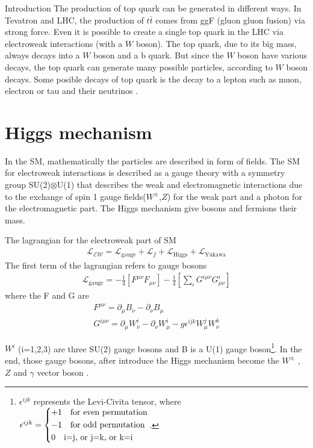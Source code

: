 \begin{chapter}{Introduction}
The production of top quark can be generated in different ways. In Tevatron and LHC, the production of $t\bar{t}$ comes from ggF (gluon gluon fusion) via strong force. Even it is possible to create a single top quark in the LHC via electroweak interactions (with a $W$ boson)\cite{th1}.  
The top quark, due to its big mass, always decays into a $W$ boson and a b quark. But since the $W$ boson have various decays, the top quark can generate many possible particles, according to $W$ boson decays. Some posible decays of top quark is the decay to a lepton such as muon, electron or tau and their neutrinos . %

\pagebreak



\section{Higgs mechanism}
In the SM, mathematically the particles are described in form of fields. The SM for electroweak interactions is described as a gauge theory with a symmetry group SU(2)$\otimes$U(1) that describes the weak and electromagnetic interactions
due to the exchange of spin 1 gauge fields($W^{\pm}$,$Z$) for the weak part and a photon for the electromagnetic part. The Higgs mechanism give bosons and fermions their mass. 

The lagrangian for the electroweak part of SM
\begin{align}\label{sml}
\mathcal{L_{\text{EW}}}=\mathcal{L}_\text{gauge}+\mathcal{L}_f +\mathcal{L}_\text{Higgs} + \mathcal{L}_\text{Yukawa}
\end{align}
The first term of the lagrangian refers to gauge bosons  
 \begin{align}\label{smg}
 \mathcal{L}_\text{gauge}=-\frac{1}{4}\left[F^{\mu\nu}F_{\mu\nu}\right]-\frac{1}{4}\left[\sum_{i}G^{i\mu\nu}G^i_{\mu\nu}\right]
 \end{align}
where  the  F and G  are 
\begin{align}
F^{\mu \nu}=\partial_\mu B_\nu -\partial_\nu B_\mu \\
G^{i\mu\nu}=\partial_\mu W^i_\nu -\partial_\nu W^i_\mu -g\epsilon^{ijk}W^j_\mu W^k_\nu 
\end{align}

$W^i$ (i=1,2,3) are three  SU(2) gauge bosons and B is a U(1) gauge boson\footnote{$\epsilon^{ijk}$ represents the Levi-Civita tensor, where $\epsilon^{ijk}= \begin{dcases}
	+1 \quad  \text{for even permutation} \\
	-1 \quad \text{for odd permutation}\\
	0 \quad \text{i=j, or j=k, or k=i } 
	\end{dcases}$.}. In the end, those gauge bosons, after introduce the Higgs mechanism  become the $W^\pm$ , $Z$ and $\gamma$ vector boson
\cite{ew1}\cite{ew2}. %
\\


\end{chapter}
